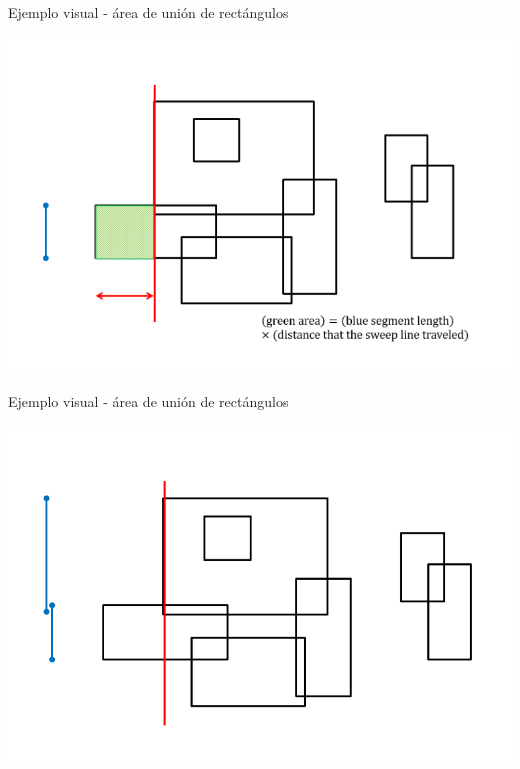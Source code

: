\documentclass[compress]{beamer}
\begin{document}
\begin{frame}{Ejemplo visual - área de unión de rectángulos}
\begin{center}
\includegraphics[scale=0.4]{images/sweep_line_3.png}
\end{center}
\end{frame}

\begin{frame}{Ejemplo visual - área de unión de rectángulos}
\begin{center}
\includegraphics[scale=0.4]{images/sweep_line_4.png}
\end{center}
\end{frame}
\end{document}
